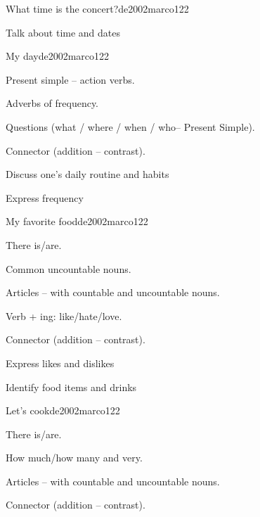 \begin{syllabus}
\begin{unit}{What time is the concert?}{}{de2002marco}{12}{2}
   \begin{learningoutcomes}
      \item Talk about time and dates
   \end{learningoutcomes}

\end{unit}
\begin{unit}{My day}{}{de2002marco}{12}{2}
   \begin{topics}
      \item Present simple – action verbs.
      \item Adverbs of frequency.
      \item Questions (what / where / when / who– Present Simple).
      \item Connector (addition – contrast).
   \end{topics}

   \begin{learningoutcomes}
      \item Discuss one’s daily routine and habits
      \item Express frequency
   \end{learningoutcomes}
\end{unit}

\begin{unit}{My favorite food}{}{de2002marco}{12}{2}
   \begin{topics}
      \item There is/are.
      \item Common uncountable nouns.
      \item Articles – with countable and uncountable nouns.
      \item Verb + ing: like/hate/love.
      \item Connector (addition – contrast).
   \end{topics}

   \begin{learningoutcomes}
      \item Express likes and dislikes
      \item Identify food items and drinks
   \end{learningoutcomes}

\end{unit}

\begin{unit}{Let's cook}{}{de2002marco}{12}{2}
   \begin{topics}
      \item There is/are.
      \item How much/how many and very.
      \item Articles – with countable and uncountable nouns.
      \item Connector (addition – contrast).
   \end{topics}


\end{unit}
\end{syllabus}
